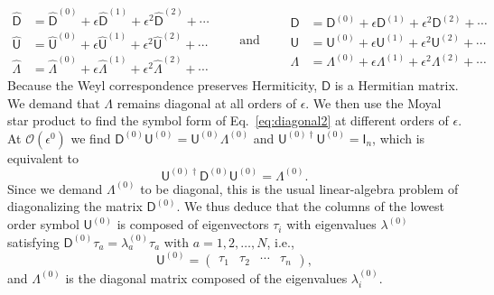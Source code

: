 %
\begin{equation}
  \begin{aligned}
    \widehat{\mathsf{D}} &= \widehat{\mathsf{D}}^{(0)} + \epsilon\widehat{\mathsf{D}}^{(1)} + \epsilon^{2}\widehat{\mathsf{D}}^{(2)} + \cdots\\
    \widehat{\mathsf{U}} &= \widehat{\mathsf{U}}^{(0)} + \epsilon\widehat{\mathsf{U}}^{(1)} + \epsilon^{2}\widehat{\mathsf{U}}^{(2)} + \cdots\\
    \widehat{\Lambda} &= \widehat{\Lambda}^{(0)} + \epsilon\widehat{\Lambda}^{(1)} + \epsilon^{2}\widehat{\Lambda}^{(2)} + \cdots
  \end{aligned}
  \qquad\text{and}\qquad
  \begin{aligned}
    {\mathsf{D}} &= {\mathsf{D}}^{(0)} + \epsilon{\mathsf{D}}^{(1)} + \epsilon^{2}{\mathsf{D}}^{(2)} + \cdots\\
    {\mathsf{U}} &= {\mathsf{U}}^{(0)} + \epsilon{\mathsf{U}}^{(1)} + \epsilon^{2}{\mathsf{U}}^{(2)} + \cdots\\
    {\Lambda} &= {\Lambda}^{(0)} + \epsilon{\Lambda}^{(1)} + \epsilon^{2}{\Lambda}^{(2)} + \cdots
  \end{aligned}
\end{equation}
%
Because the Weyl correspondence preserves Hermiticity, $\mathsf{D}$ is a Hermitian matrix.
We demand that $\Lambda$ remains diagonal at all orders of $\epsilon$.
We then use the Moyal star product to find the symbol form of Eq.~\eqref{eq:diagonal2} at different orders of $\epsilon$.
At $\mathcal{O}(\epsilon^0)$ we find $\mathsf{D}^{(0)}\mathsf{U}^{(0)} = \mathsf{U}^{(0)}\Lambda^{(0)}$ and $\mathsf{U}^{(0)\dagger}\mathsf{U}^{(0)} = \mathsf{I}_{n}$, which is equivalent to
%
\begin{equation}
  \mathsf{U}^{(0)\dagger}\mathsf{D}^{(0)}\mathsf{U}^{(0)} = \Lambda^{(0)}.\label{eq:omega0}
\end{equation}
%
Since we demand $\Lambda^{(0)}$ to be diagonal, this is the usual linear-algebra problem of diagonalizing the matrix $\mathsf{D}^{(0)}$.
We thus deduce that the columns of the lowest order symbol $\mathsf{U}^{(0)}$ is composed of eigenvectors $\tau_{i}$ with eigenvalues $\lambda^{(0)}$ satisfying $\mathsf{D}^{(0)}\tau_{a} = \lambda^{(0)}_{a}\tau_{a}$ with $a = 1,2,\ldots,N$, i.e.,
%
\begin{equation}
  \mathsf{U}^{(0)} =
  \begin{pmatrix}
    \tau_{1} & \tau_{2} & \cdots & \tau_{n}
  \end{pmatrix},
\end{equation}
%
and $\Lambda^{(0)}$ is the diagonal matrix composed of the eigenvalues $\lambda_{i}^{(0)}$.

